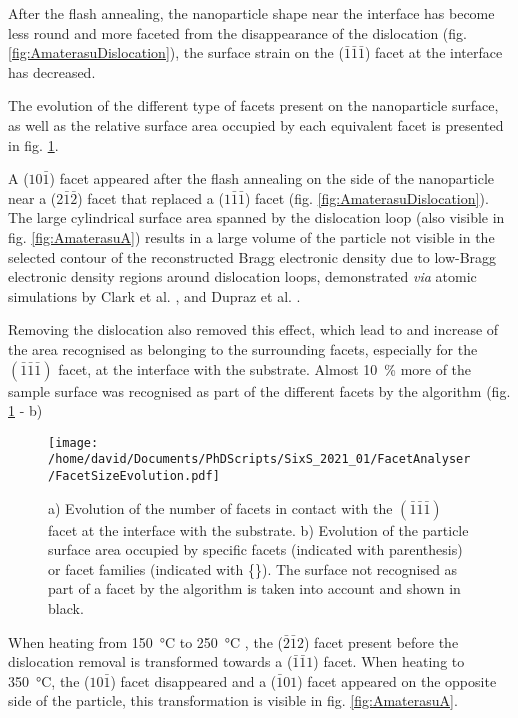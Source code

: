 After the flash annealing, the nanoparticle shape near the interface has become less round and more faceted from the disappearance of the dislocation (fig. \ref{fig:AmaterasuDislocation}), the surface strain on the ($\bar{1}\bar{1}\bar{1}$) facet at the interface has decreased.

The evolution of the different type of facets present on the nanoparticle surface, as well as the relative surface area occupied by each equivalent facet is presented in fig. \ref{fig:AmaterasuFacetsEvolution}.

A ($10\bar{1}$) facet appeared after the flash annealing on the side of the nanoparticle near a (2$\bar{1}\bar{2}$) facet that replaced a ($1\bar{1}\bar{1}$) facet (fig. \ref{fig:AmaterasuDislocation}).
The large cylindrical surface area spanned by the dislocation loop (also visible in fig. \ref{fig:AmaterasuA}) results in a large volume of the particle not visible in the selected contour of the reconstructed Bragg electronic density due to low-Bragg electronic density regions around dislocation loops, demonstrated \textit{via} atomic simulations by Clark et al. \parencite*{Clark2015}, and Dupraz et al. \parencite*{Dupraz2017}.

Removing the dislocation also removed this effect, which lead to and increase of the area recognised as belonging to the surrounding facets, especially for the $(\bar{1}\bar{1}\bar{1})$ facet, at the interface with the substrate.
Almost \qty{10}{\percent} more of the sample surface was recognised as part of the different facets by the algorithm (fig. \ref{fig:AmaterasuFacetsEvolution} - b)

\begin{figure}[!htb]
    \centering
    \texttt{[image: /home/david/Documents/PhDScripts/SixS\_2021\_01/FacetAnalyser/FacetSizeEvolution.pdf]}
    \caption{
        a) Evolution of the number of facets in contact with the $(\bar{1}\bar{1}\bar{1})$ facet at the interface with the substrate.
        b) Evolution of the particle surface area occupied by specific facets (indicated with parenthesis) or facet families (indicated with \{\}).
        The surface not recognised as part of a facet by the algorithm is taken into account and shown in black.
    }
    \label{fig:AmaterasuFacetsEvolution}
\end{figure}

When heating from \qty{150}{\degreeCelsius} to \qty{250}{\degreeCelsius} , the ($\bar{2}\bar{1}2$) facet present before the dislocation removal is transformed towards a ($\bar{1}\bar{1}1$) facet.
When heating to \qty{350}{\degreeCelsius}, the ($10\bar{1}$) facet disappeared and a ($\bar{1}01$) facet appeared on the opposite side of the particle, this transformation is visible in fig. \ref{fig:AmaterasuA}.

